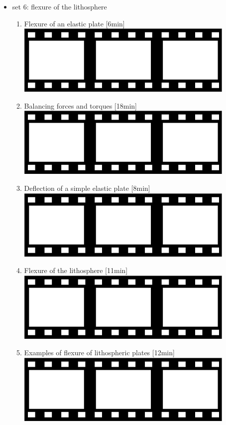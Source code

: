 \begin{itemize}
\item set 6: flexure of the lithosphere
\begin{enumerate}
\item Flexure of an elastic plate [6min] \href{https://youtu.be/WIm_g53K8B8?si=InI269vgcFNBbtYz}{\includegraphics[width=.8cm]{images/pictograms/film.png}}
\item Balancing forces and torques [18min] \href{https://youtu.be/pHmKQe7StAM?si=RwITi7foVbrmRSSm}{\includegraphics[width=.8cm]{images/pictograms/film.png}}
\item Deflection of a simple elastic plate [8min] \href{https://youtu.be/P73dYtuQ6Pg?si=U4rzWk3-LQmLoxAs}{\includegraphics[width=.8cm]{images/pictograms/film.png}}
\item Flexure of the lithosphere [11min] \href{https://youtu.be/AkFKYXNhsdY?si=I3FNUJSxqaWWenqw}{\includegraphics[width=.8cm]{images/pictograms/film.png}}
\item Examples of flexure of lithospheric plates [12min] \href{https://youtu.be/gbkaWUQKxI4?si=qLu29Px_4c03A9eh}{\includegraphics[width=.8cm]{images/pictograms/film.png}}
\end{enumerate}


\end{itemize}
